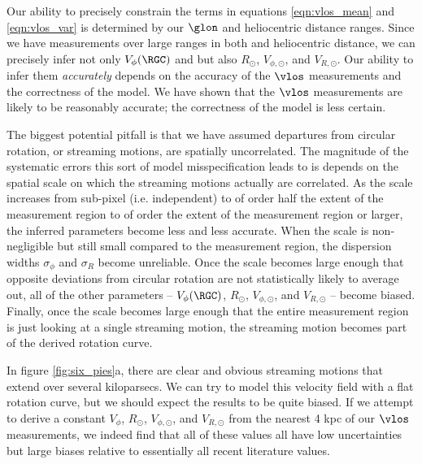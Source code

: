 Our ability to precisely constrain the terms in equations \ref{eqn:vlos_mean} and \ref{eqn:vlos_var} is determined by our $\glon$ and heliocentric distance ranges. 
Since we have measurements over large ranges in both \glon and heliocentric distance, we can precisely infer not only $V_\phi(\RGC)$ and but also $R_\odot$, $V_{\phi, \odot}$, and $V_{R, \odot}$. 
Our ability to infer them \emph{accurately} depends on the accuracy of the $\vlos$ measurements and the correctness of the model.
We have shown that the $\vlos$ measurements are likely to be reasonably accurate; the correctness of the model is less certain.

The biggest potential pitfall is that we have assumed departures from circular rotation, or streaming motions, are spatially uncorrelated.
The magnitude of the systematic errors this sort of model misspecification leads to is depends on the spatial scale on which the streaming motions actually are correlated.
As the scale increases from sub-pixel (i.e. independent) to of order half the extent of the measurement region to of order the extent of the measurement region or larger, the inferred parameters become less and less accurate. 
When the scale is non-negligible but still small compared to the measurement region, the dispersion widths $\sigma_\phi$ and $\sigma_R$ become unreliable.
Once the scale becomes large enough that opposite deviations from circular rotation are not statistically likely to average out, all of the other parameters -- $V_\phi(\RGC)$, $R_\odot$, $V_{\phi, \odot}$, and $V_{R, \odot}$ -- become biased.
Finally, once the scale becomes large enough that the entire measurement region is just looking at a single streaming motion, the streaming motion becomes part of the derived rotation curve.

In figure \ref{fig:six_pies}a, there are clear and obvious streaming motions that extend over several kiloparsecs. 
We can try to model this velocity field with a flat rotation curve, but we should expect the results to be quite biased.
If we attempt to derive a constant $V_\phi$, $R_\odot$, $V_{\phi, \odot}$, and $V_{R,\odot}$ from the  nearest 4 kpc of our $\vlos$ measurements, we indeed find that all of these values all have low uncertainties but large biases relative to essentially all recent literature values. 



